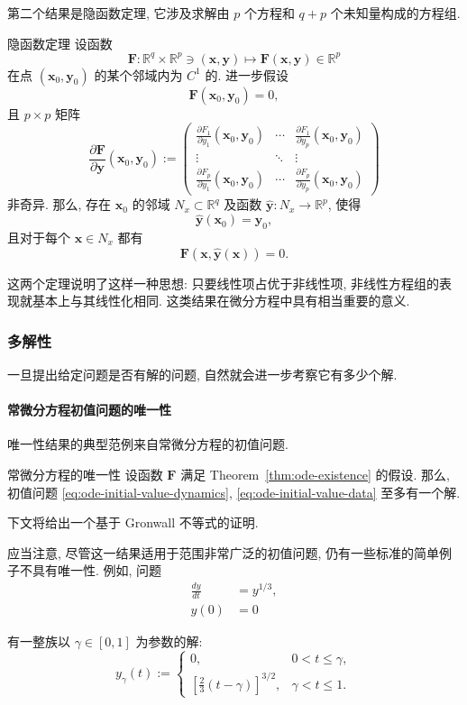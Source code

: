 第二个结果是隐函数定理, 它涉及求解由 $p$ 个方程和 $q+p$ 个未知量构成的方程组.

\begin{Theorem}{隐函数定理}
\label{thm:implicit-function}
设函数
\[
\mathbf{F}:\mathbb{R}^q\times\mathbb{R}^p\ni(\mathbf{x},\mathbf{y})\mapsto\mathbf{F}(\mathbf{x},\mathbf{y})\in\mathbb{R}^p
\]
在点 $(\mathbf{x}_0,\mathbf{y}_0)$ 的某个邻域内为 $C^1$ 的. 进一步假设
\[
\mathbf{F}(\mathbf{x}_0,\mathbf{y}_0)=0,
\]
且 $p\times p$ 矩阵
\[
\frac{\partial\mathbf{F}}{\partial\mathbf{y}}(\mathbf{x}_0,\mathbf{y}_0):=
\begin{pmatrix}
\frac{\partial F_1}{\partial y_1}(\mathbf{x}_0,\mathbf{y}_0)&\cdots&\frac{\partial F_1}{\partial y_p}(\mathbf{x}_0,\mathbf{y}_0)\\
\vdots&\ddots&\vdots\\
\frac{\partial F_p}{\partial y_1}(\mathbf{x}_0,\mathbf{y}_0)&\cdots&\frac{\partial F_p}{\partial y_p}(\mathbf{x}_0,\mathbf{y}_0)
\end{pmatrix}
\]
非奇异. 那么, 存在 $\mathbf{x}_0$ 的邻域 $N_x\subset\mathbb{R}^q$ 及函数 $\hat{\mathbf{y}}:N_x\to\mathbb{R}^p$, 使得
\[
\hat{\mathbf{y}}(\mathbf{x}_0)=\mathbf{y}_0,
\]
且对于每个 $\mathbf{x}\in N_x$ 都有
\[
\mathbf{F}(\mathbf{x},\hat{\mathbf{y}}(\mathbf{x}))=0.
\]
\end{Theorem}

这两个定理说明了这样一种思想: 只要线性项占优于非线性项, 非线性方程组的表现就基本上与其线性化相同. 这类结果在微分方程中具有相当重要的意义.

\subsubsection{多解性}\label{subsec:multiplicity}

一旦提出给定问题是否有解的问题, 自然就会进一步考察它有多少个解.

\paragraph*{常微分方程初值问题的唯一性}

唯一性结果的典型范例来自常微分方程的初值问题.

\begin{Theorem}{常微分方程的唯一性}
\label{thm:ode-uniqueness}
设函数 $\mathbf{F}$ 满足 Theorem~\ref{thm:ode-existence} 的假设. 那么, 初值问题 \eqref{eq:ode-initial-value-dynamics}, \eqref{eq:ode-initial-value-data} 至多有一个解.
\end{Theorem}

下文将给出一个基于 Gronwall 不等式的证明.

应当注意, 尽管这一结果适用于范围非常广泛的初值问题, 仍有一些标准的简单例子不具有唯一性. 例如, 问题
\[
\begin{aligned}
\frac{dy}{dt}&=y^{1/3},\\
y(0)&=0
\end{aligned}
\]

有一整族以 $\gamma\in[0,1]$ 为参数的解:
\[
y_\gamma(t):=\begin{cases}
0,&0<t\leq\gamma,\\
\left[\frac{2}{3}(t-\gamma)\right]^{3/2},&\gamma<t\leq1.
\end{cases}
\]
